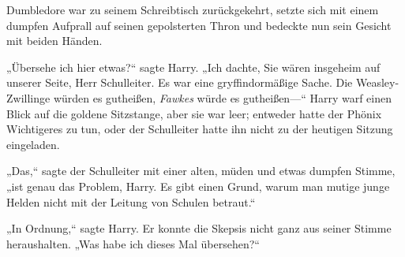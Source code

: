 Dumbledore war zu seinem Schreibtisch zurückgekehrt, setzte sich mit einem dumpfen Aufprall auf seinen gepolsterten Thron und bedeckte nun sein Gesicht mit beiden Händen.

„Übersehe ich hier etwas?“ sagte Harry. „Ich dachte, Sie wären insgeheim auf unserer Seite, Herr Schulleiter. Es war eine gryffindormäßige Sache. Die Weasley-Zwillinge würden es gutheißen, \emph{Fawkes} würde es gutheißen—“ Harry warf einen Blick auf die goldene Sitzstange, aber sie war leer; entweder hatte der Phönix Wichtigeres zu tun, oder der Schulleiter hatte ihn nicht zu der heutigen Sitzung eingeladen.

„Das,“ sagte der Schulleiter mit einer alten, müden und etwas dumpfen Stimme, „ist genau das Problem, Harry. Es gibt einen Grund, warum man mutige junge Helden nicht mit der Leitung von Schulen betraut.“

„In Ordnung,“ sagte Harry. Er konnte die Skepsis nicht ganz aus seiner Stimme heraushalten. „Was habe ich dieses Mal übersehen?“

